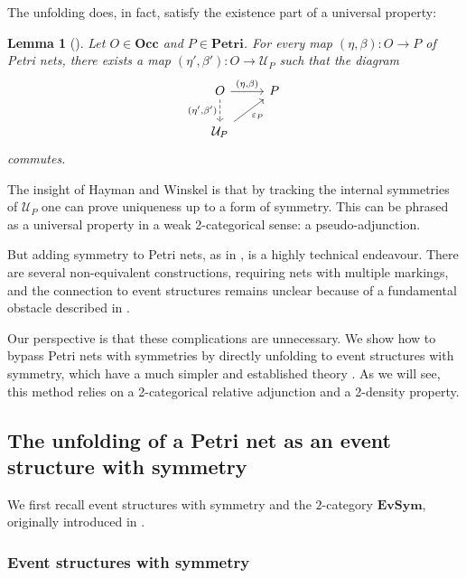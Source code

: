 \documentclass[11pt,a4paper]{article}
\theoremstyle{plain}
\newtheorem{lemma}[theorem]{Lemma}
\theoremstyle{definition}
\theoremstyle{remark}
\newcommand{\calU}{\mathcal{U}}
\newcommand{\Occ}{\mathbf{Occ}}
\newcommand{\Petri}{\mathbf{Petri}}
\newcommand{\SES}{\mathbf{EvSym}}
\begin{document}
The unfolding does, in fact, satisfy the existence part of a universal property: 
\begin{lemma}[\cite{GENUN, ES2}]
\label{lemmawinskel}
Let $O \in \Occ$ and $P \in \Petri$. For every map  $(\eta, \beta): O  \rightarrow P$ of Petri nets, there exists a map $(\eta', \beta') : O \rightarrow \calU_P$ such that the diagram 
    \[\begin{tikzcd}
	O & P \\
	{\calU_P}
	\arrow["{(\eta,\beta)}", from=1-1, to=1-2]
	\arrow["{(\eta',\beta')}"', dashed, from=1-1, to=2-1]
	\arrow["{\varepsilon_P}"', from=2-1, to=1-2]
\end{tikzcd}\]
commutes. 
\end{lemma}
The insight of Hayman and Winskel \cite{GENUN} is that by tracking the internal symmetries of $\calU_P$ one can prove uniqueness up to a form of symmetry. This can be phrased as a universal property in a weak 2-categorical sense: a pseudo-adjunction. 

But adding symmetry to Petri nets, as in \cite{GENUN}, is a highly technical endeavour. There are several non-equivalent constructions, requiring nets with multiple markings, and the connection to event structures remains unclear because of a fundamental obstacle described in \cite[\S 7.1]{SPN}.

Our perspective is that these complications are unnecessary. We show how to bypass Petri nets with symmetries by directly unfolding to event structures with symmetry, which have a much simpler and established theory \cite{ESS}.  As we will see, this method relies on a 2-categorical relative adjunction and a 2-density property.


\subsection{The unfolding of a Petri net as an event structure with symmetry}

We first recall event structures with symmetry and the $2$-category $\SES$, originally introduced in \cite{ESS}.

\subsubsection{Event structures with symmetry}
\end{document}
